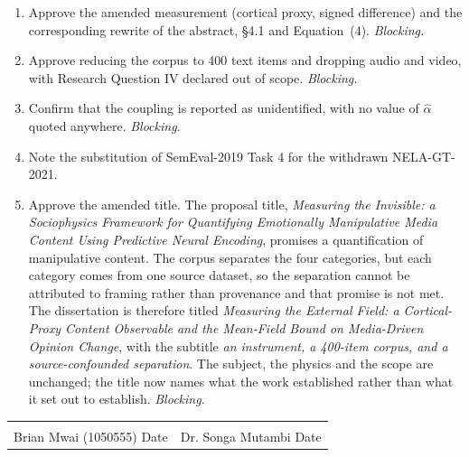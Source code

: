 \documentclass[11pt,a4paper]{article}
\begin{document}
\begin{enumerate}[leftmargin=1.6em]
\item Approve the amended measurement (cortical proxy, signed difference) and the
corresponding rewrite of the abstract, \S4.1 and Equation~(4). \emph{Blocking.}
\item Approve reducing the corpus to 400 text items and dropping audio and video,
with Research Question IV declared out of scope. \emph{Blocking.}
\item Confirm that the coupling is reported as unidentified, with no value of
$\hat{\alpha}$ quoted anywhere. \emph{Blocking.}
\item Note the substitution of SemEval-2019 Task 4 for the withdrawn NELA-GT-2021.
\item Approve the amended title. The proposal title, \emph{Measuring the Invisible: a
Sociophysics Framework for Quantifying Emotionally Manipulative Media Content Using
Predictive Neural Encoding}, promises a quantification of manipulative content. The corpus
separates the four categories, but each category comes from one source dataset, so the
separation cannot be attributed to framing rather than provenance and that promise is not
met. The dissertation is therefore titled \emph{Measuring the External Field: a
Cortical-Proxy Content Observable and the Mean-Field Bound on Media-Driven Opinion Change},
with the subtitle \emph{an instrument, a 400-item corpus, and a source-confounded
separation}. The subject, the physics and the scope are unchanged; the title now names what
the work established rather than what it set out to establish. \emph{Blocking.}
\end{enumerate}

\vspace{1.5em}
\begin{tabular}{@{}p{7cm}p{7cm}@{}}
\hrulefill & \hrulefill \\
Brian Mwai (1050555) \quad Date & Dr. Songa Mutambi \quad Date \\
\end{tabular}
\end{document}
